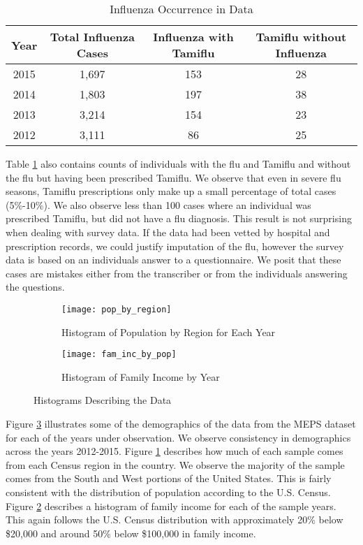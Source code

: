 \documentclass[twoside,11pt]{article}
\begin{document}
\begin{table}[h]
\centering
\caption{Influenza Occurrence in Data}
\label{flu_counts}
\begin{tabular}{cccc}
\hline
Year & Total Influenza Cases & Influenza with Tamiflu & Tamiflu without Influenza\\ \hline
2015 & 1,697 & 153 & 28\\
2014 & 1,803 & 197 & 38\\
2013 & 3,214 & 154 & 23\\
2012 & 3,111 & 86 & 25\\
\end{tabular}
\end{table}

Table \ref{flu_counts} also contains counts of individuals with the flu and Tamiflu and without the flu but having been prescribed Tamiflu.  We observe that even in severe flu seasons, Tamiflu prescriptions only make up a small percentage of total cases (5\%-10\%).  We also observe less than 100 cases where an individual was prescribed Tamiflu, but did not have a flu diagnosis.  This result is not surprising when dealing with survey data.  If the data had been vetted by hospital and prescription records, we could justify imputation of the flu, however the survey data is based on an individuals answer to a questionnaire. We posit that these cases are mistakes either from the transcriber or from the individuals answering the questions.  

\begin{figure}[h]
\centering
\begin{subfigure}{.5\textwidth}
  \centering
  \texttt{[image: pop\_by\_region]}
  \caption{Histogram of Population by Region for Each Year}
  \label{fig:hist_by_region}
\end{subfigure}%
\begin{subfigure}{.7\textwidth}
  \centering
  \texttt{[image: fam\_inc\_by\_pop]}
  \caption{Histogram of Family Income by Year}
  \label{fig:hist_by_inc}
\end{subfigure}
\caption{Histograms Describing the Data}
\label{fig:data_desc}
\end{figure}

Figure \ref{fig:data_desc} illustrates some of the demographics of the data from the MEPS dataset for each of the years under observation.  We observe consistency in demographics across the years 2012-2015.  Figure \ref{fig:hist_by_region} describes how much of each sample comes from each Census region in the country.  We observe the majority of the sample comes from the South and West portions of the United States.  This is fairly consistent with the distribution of population according to the U.S. Census.  Figure \ref{fig:hist_by_inc} describes a histogram of family income for each of the sample years.  This again follows the U.S. Census distribution with approximately 20\% below \$20,000 and around 50\% below \$100,000 in family income.     
\end{document}
